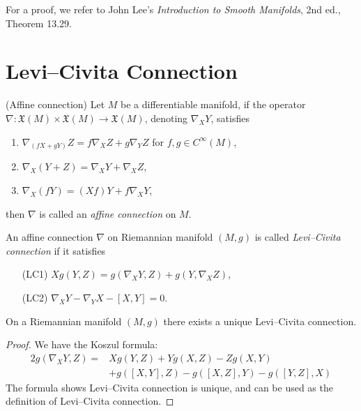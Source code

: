 For a proof, we refer to John Lee's \emph{Introduction to Smooth Manifolds}, 2nd ed., Theo\-rem 13.29.

\section{Levi--Civita Connection}

\begin{defn}(Affine connection)
    Let $M$ be a differentiable manifold, if the operator $\nabla:\mathfrak{X}(M)\times\mathfrak{X}(M)\to\mathfrak{X}(M)$, denoting $\nabla_XY$, satisfies
    \begin{enumerate}[(1)]
        \item $\nabla_{(fX+gY)}Z=f\nabla_XZ+g\nabla_YZ$ for $f,g\in C^\infty(M)$,
        \item $\nabla_X(Y+Z)=\nabla_XY+\nabla_XZ$,
        \item $\nabla_X(fY)=(Xf)Y+f\nabla_XY$,
    \end{enumerate}
    then $\nabla$ is called an \emph{affine connection} on $M$.
\end{defn}

\begin{defn}
    An affine connection $\nabla$ on Riemannian manifold $(M,g)$ is called \emph{Levi--Civita connection} if it satisfies
    \begin{itemize}
        \item[(LC1)] $Xg(Y,Z)=g(\nabla_XY,Z)+g(Y,\nabla_XZ)$,
        \item[(LC2)] $\nabla_XY-\nabla_YX-[X,Y]=0$.
    \end{itemize}
\end{defn}

\begin{prop}
    On a Riemannian manifold $(M,g)$ there exists a unique Levi--Civita connection.
\end{prop}
\begin{proof}
    We have the Koszul formula:
    \begin{align*}
        2g(\nabla_XY,Z)=&Xg(Y,Z)+Yg(X,Z)-Zg(X,Y)\\
        &+g([X,Y],Z)-g([X,Z],Y)-g([Y,Z],X)
    \end{align*}
    The formula shows Levi--Civita connection is unique, and can be used as the definition of Levi--Civita connection.
\end{proof}

